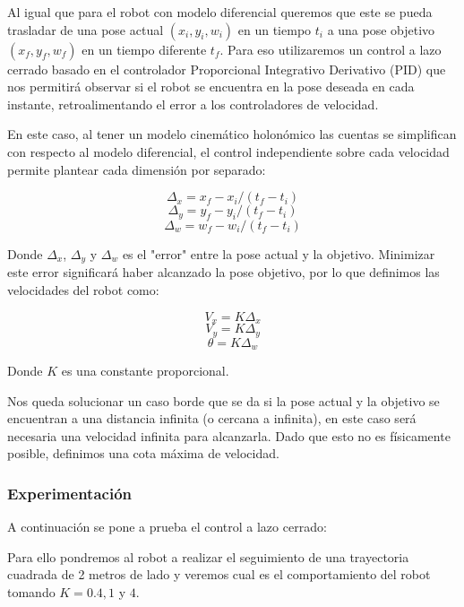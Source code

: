 Al igual que para el robot con modelo diferencial queremos que este se pueda trasladar de una pose actual $(x_i,y_i,w_i)$ en un tiempo $t_i$ a una pose objetivo $(x_f,y_f,w_f)$ en un tiempo diferente $t_f$. Para eso utilizaremos un control a lazo cerrado basado en el controlador Proporcional Integrativo Derivativo (PID) que nos permitirá observar si el robot se encuentra en la pose deseada en cada instante, retroalimentando el error a los controladores de velocidad.

En este caso, al tener un modelo cinemático holonómico las cuentas se simplifican con respecto al modelo diferencial, el control independiente sobre cada velocidad permite plantear cada  dimensión por separado:

$$\Delta_x = x_f - x_i / (t_f - t_i)$$
$$\Delta_y = y_f - y_i / (t_f - t_i)$$
$$\Delta_w = w_f - w_i / (t_f - t_i)$$

Donde $\Delta_x$, $\Delta_y$ y $\Delta_w$ es el "error" entre la pose actual y la objetivo. Minimizar este error significará haber alcanzado la pose objetivo, por lo que definimos las velocidades del robot como:

$$V_x = K \Delta_x $$
$$V_y = K \Delta_y $$
$$\theta = K \Delta_w $$

Donde $K$ es una constante proporcional.


Nos queda solucionar un caso borde que se da si la pose actual y la objetivo se encuentran a una distancia infinita (o cercana a infinita), en este caso será necesaria una velocidad infinita para alcanzarla. Dado que esto no es físicamente posible, definimos una cota máxima de velocidad.


\subsubsection{Experimentación}

A continuación se pone a prueba el control a lazo cerrado:

Para ello pondremos al robot a realizar el seguimiento de una trayectoria cuadrada de 2 metros de lado y veremos cual es el comportamiento del robot tomando $K=0.4,1$ y $4$.


